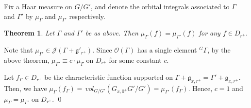 \documentclass[11pt]{amsart}
\newtheorem{theorem}{Theorem}[section]
\theoremstyle{definition}
\theoremstyle{remark}
\numberwithin{equation}{theorem}
\newcommand{\G}{{\mathbb{G}}}
\begin{document}

Fix a Haar measure on $G/G'$, and denote the orbital integrals
associated to $\Gamma$ and $\Gamma'$ by $\mu_\Gamma$ and
$\mu_{\Gamma'}$ respectively.

\begin{theorem}
Let $\Gamma$ and $\Gamma'$ be as above. Then
$\mu_\Gamma(f)=\mu_{\Gamma'}(f)$ for any $f\in D_{r^+}$.
\end{theorem}

\proof Note that $\mu_{\Gamma'}\in \mathcal J(\Gamma+\mathfrak
g'_{r^+})$. Since $\mathcal O(\Gamma)$ has a single element
$^G\Gamma$, by the above theorem, $\mu_{\Gamma'}\equiv
c\cdot\mu_\Gamma$ on $D_{r^+}$ for some constant $c$.

Let $f_\Gamma\in D_{r^+}$ be the characteristic function supported
on $\Gamma+\mathfrak g_{x,r^+}=\Gamma'+\mathfrak g_{x,r^+}$. Then,
we have $\mu_\Gamma(f_\Gamma)=\,vol_{G/G'}(G_{x,0^+}G'/G')
=\mu_{\Gamma'}(f_\Gamma)$. Hence, $c=1$ and
$\mu_\Gamma=\mu_{\Gamma'}$ on $D_{r^+}$. \qed
\end{document}
